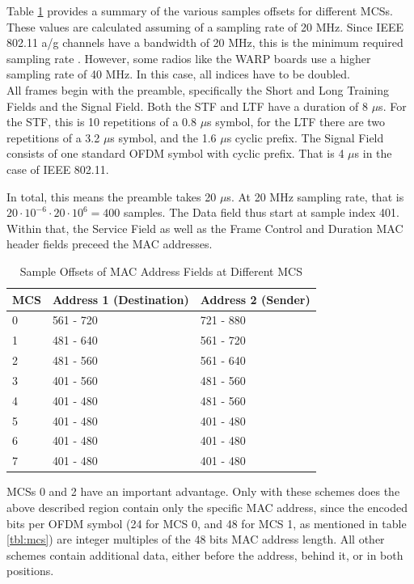 Table \ref{tbl:sample-offsets} provides a summary of the various samples offsets for different \glspl{MCS}. These values are calculated assuming of a sampling rate of 20 MHz. Since IEEE 802.11 a/g channels have a bandwidth of 20 MHz, this is the minimum required sampling rate \cite{ieee2012}. However, some radios like the WARP boards use a higher sampling rate of 40 MHz. In this case, all indices have to be doubled.\\

All frames begin with the preamble, specifically the Short and Long Training Fields and the Signal Field. Both the STF and LTF have a duration of 8 $\mu$s. For the STF, this is 10 repetitions of a 0.8 $\mu$s symbol, for the LTF there are two repetitions of a 3.2 $\mu$s symbol, and the 1.6 $\mu$s cyclic prefix. The Signal Field consists of one standard \gls{OFDM} symbol with cyclic prefix. That is 4 $\mu$s in the case of IEEE 802.11.

In total, this means the preamble takes 20 $\mu$s. At 20 MHz sampling rate, that is $ 20 \cdot 10^{-6} \cdot 20 \cdot 10^6 = 400 $ samples. The Data field thus start at sample index 401. Within that, the Service Field as well as the Frame Control and Duration MAC header fields preceed the MAC addresses.\\

\begin{table}[ht]
	\centering
	\begin{tabular}{|p{2.5cm}|p{4.5cm}|p{4.5cm}|}
		\hline
		\textbf{MCS} & \textbf{Address 1 (Destination)} & \textbf{Address 2 (Sender)} \\ \hline
		0 & 561 - 720 & 721 - 880 \\ \hline
		1 & 481 - 640 & 561 - 720 \\ \hline
		2 & 481 - 560 & 561 - 640 \\ \hline
		3 & 401 - 560 & 481 - 560 \\ \hline
		4 & 401 - 480 & 481 - 560 \\ \hline
		5 & 401 - 480 & 401 - 480 \\ \hline
		6 & 401 - 480 & 401 - 480 \\ \hline
		7 & 401 - 480 & 401 - 480 \\ \hline
	\end{tabular}
	\caption{Sample Offsets of MAC Address Fields at Different MCS}
	\label{tbl:sample-offsets}
\end{table}

\glspl{MCS} 0 and 2 have an important advantage. Only with these schemes does the above described region contain only the specific MAC address, since the encoded bits per OFDM symbol (24 for MCS 0, and 48 for MCS 1, as mentioned in table \ref{tbl:mcs}) are integer multiples of the 48 bits MAC address length. All other schemes contain additional data, either before the address, behind it, or in both positions.


